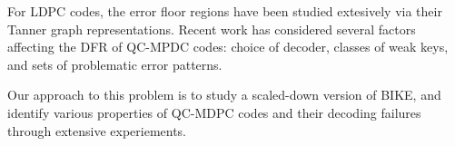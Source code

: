 For LDPC codes, the error floor regions have been studied extesively via their Tanner graph representations. Recent work \cite{Vasseur-thesis,Vasseur:2021:eprint,tillich:2018:decoding,SV:2019:extrapolate} has considered several factors affecting the DFR of QC-MPDC codes: choice of decoder, classes of weak keys, and sets of problematic error patterns.

Our approach to this problem is to study a scaled-down version of BIKE, and identify various properties of QC-MDPC codes and their decoding failures through extensive experiements.